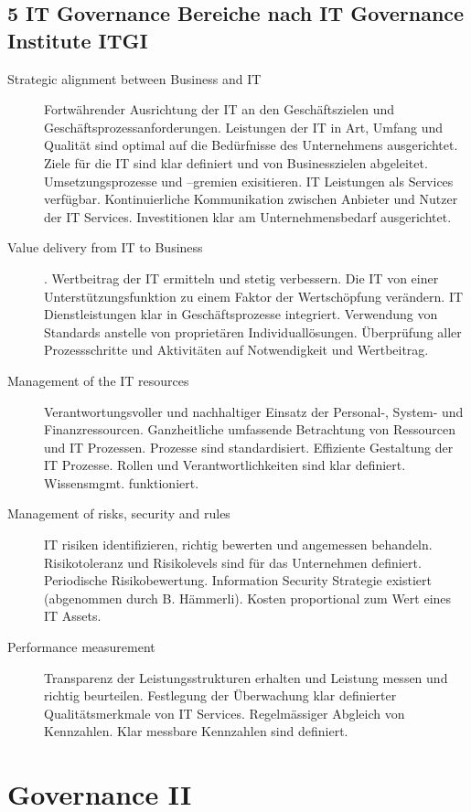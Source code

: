 \subsection{5 IT Governance Bereiche nach IT Governance Institute ITGI}
\begin{description}
	\item[Strategic alignment between Business and IT] Fortwährender Ausrichtung der IT an den Geschäftszielen und Geschäftsprozessanforderungen. Leistungen der IT in Art, Umfang und Qualität sind optimal auf die Bedürfnisse des Unternehmens ausgerichtet. Ziele für die IT sind klar definiert und von Businesszielen abgeleitet. Umsetzungsprozesse und –gremien exisitieren. IT Leistungen als Services verfügbar. Kontinuierliche Kommunikation zwischen Anbieter und Nutzer der IT Services. Investitionen klar am Unternehmensbedarf ausgerichtet.
	\item[Value delivery from IT to Business]. Wertbeitrag der IT ermitteln und stetig verbessern. Die IT von einer Unterstützungsfunktion zu einem Faktor der Wertschöpfung verändern. IT Dienstleistungen klar in Geschäftsprozesse integriert. Verwendung von Standards anstelle von proprietären	Individuallösungen. Überprüfung aller Prozessschritte und Aktivitäten auf Notwendigkeit und Wertbeitrag.
	\item[Management of the IT resources] Verantwortungsvoller und nachhaltiger Einsatz der Personal-, System- und Finanzressourcen. Ganzheitliche umfassende Betrachtung von Ressourcen und IT Prozessen. Prozesse sind standardisiert. Effiziente Gestaltung der IT Prozesse. Rollen und Verantwortlichkeiten sind klar definiert. Wissensmgmt. funktioniert.
	\item[Management of risks, security and rules] IT risiken identifizieren, richtig bewerten und angemessen behandeln. Risikotoleranz und Risikolevels sind für das Unternehmen definiert. Periodische Risikobewertung. Information Security Strategie existiert (abgenommen durch B. Hämmerli). Kosten proportional zum Wert eines IT Assets. 
	\item[Performance measurement] Transparenz der Leistungsstrukturen erhalten und Leistung messen und richtig beurteilen. Festlegung der Überwachung klar definierter Qualitätsmerkmale von IT Services. Regelmässiger Abgleich von Kennzahlen. Klar messbare Kennzahlen sind definiert.
\end{description}

\section{Governance II}
